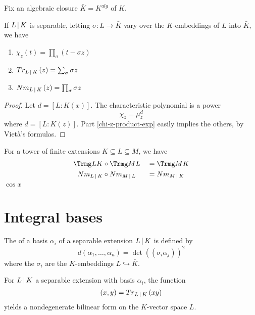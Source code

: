 Fix an algebraic closure $\bar{K} = K^{alg}$ of $K$.

\begin{prop}
  If $L \mathop{|} K$ is separable, letting $\sigma : L \to \bar{K}$ vary
  over the $K$-embeddings of $L$ into $\bar{K}$, we have
  \begin{enumerate}
  \item \label{chi-z-product-exp} $\chi_z(t) = \prod_\sigma (t - \sigma z)$
  \item ${{\mathnormal{Tr}}_{L \mathop{|} K}}\left(z\right) = \sum_\sigma \sigma z$
  \item ${{\mathnormal{Nm}}_{L \mathop{|} K}}\left(z\right) = \prod_\sigma \sigma z$
  \end{enumerate}
\end{prop}

\begin{proof}
  Let $d=[L:K(x)]$. The characteristic polynomial is a power
  \[\chi_z = \mu_z^d \]
  where $d=[L:K(z)]$. Part \ref{chi-z-product-exp} easily implies the others, by
  Viet\`a's formulas.
\end{proof}

\begin{theorem}{\label{mul-trace-norm}}
  For a tower of finite extensions $K \subseteq L \subseteq M$, we have
  \begin{alignat*}{2}
    \Trmg L K &\circ \Trmg M L &&= \Trmg M K\\
    \Nmmg L K &\circ \Nmmg M L &&= \Nmmg M K
  \end{alignat*}
  $\cos x$
\end{theorem}

\section{Integral bases}

\begin{definition}
  The  of a basis $\alpha_i$ of a separable extension
  $L \mathop{|} K$ is defined by
  \[ d(\alpha_1,\ldots,\alpha_n) = \det((\sigma_i\alpha_j))^2 \] where the
  $\sigma_i$ are the $K$-embeddings $L \hookrightarrow {\bar{K}}$.
\end{definition}


\begin{prop}{\label{trace-form-bilinear}}
  For $L \mathop{|} K$ a separable extension with basis $\alpha_i$, the
  function
  \[(x,y) = {{\mathnormal{Tr}}_{L \mathop{|} K}}\left(xy\right)\] yields a nondegenerate bilinear form on the $K$-vector
  space $L$.
\end{prop}

